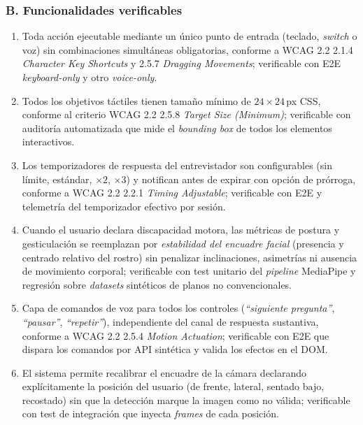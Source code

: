 \subsubsection*{B. Funcionalidades verificables}
\begin{enumerate}
  \item Toda acción ejecutable mediante un único punto de entrada
        (teclado, \textit{switch} o voz) sin combinaciones simultáneas
        obligatorias, conforme a WCAG 2.2 2.1.4
        \textit{Character Key Shortcuts} y 2.5.7
        \textit{Dragging Movements}; verificable con E2E
        \textit{keyboard-only} y otro \textit{voice-only}.
  \item Todos los objetivos táctiles tienen tamaño mínimo de
        $24\times 24$\,px CSS, conforme al criterio WCAG 2.2 2.5.8
        \textit{Target Size (Minimum)}; verificable con auditoría
        automatizada que mide el \textit{bounding box} de todos los
        elementos interactivos.
  \item Los temporizadores de respuesta del entrevistador son
        configurables (sin límite, estándar, $\times 2$, $\times 3$) y
        notifican antes de expirar con opción de prórroga, conforme a
        WCAG 2.2 2.2.1 \textit{Timing Adjustable}; verificable con E2E
        y telemetría del temporizador efectivo por sesión.
  \item Cuando el usuario declara discapacidad motora, las métricas de
        postura y gesticulación se reemplazan por
        \emph{estabilidad del encuadre facial} (presencia y centrado
        relativo del rostro) sin penalizar inclinaciones, asimetrías
        ni ausencia de movimiento corporal; verificable con test
        unitario del \textit{pipeline} MediaPipe y regresión sobre
        \textit{datasets} sintéticos de planos no convencionales.
  \item Capa de comandos de voz para todos los controles
        (\textit{``siguiente pregunta''}, \textit{``pausar''},
        \textit{``repetir''}), independiente del canal de respuesta
        sustantiva, conforme a WCAG 2.2 2.5.4 \textit{Motion
        Actuation}; verificable con E2E que dispara los comandos por
        API sintética y valida los efectos en el DOM.
  \item El sistema permite recalibrar el encuadre de la cámara
        declarando explícitamente la posición del usuario (de frente,
        lateral, sentado bajo, recostado) sin que la detección marque
        la imagen como no válida; verificable con test de integración
        que inyecta \textit{frames} de cada posición.
\end{enumerate}


